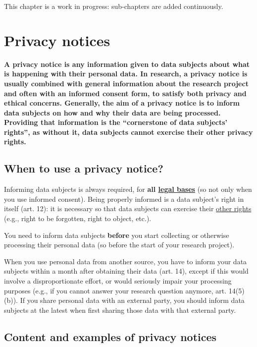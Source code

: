 \documentclass[
]{book}
\begin{document}
This chapter is a work in progress: sub-chapters are added continuously.

\hypertarget{privacy-notices}{%
\section{Privacy notices}\label{privacy-notices}}

\textbf{A privacy notice is any information given to data subjects about what is
happening with their personal data. In research, a privacy notice is usually
combined with general information about the research project and often with an
informed consent form, to satisfy both privacy and ethical concerns. Generally,
the aim of a privacy notice is to inform data subjects on how and why their
data are being processed. Providing that information is the ``cornerstone of
data subjects' rights'', as without it, data subjects cannot exercise their other
privacy rights.}

\hypertarget{when-to-use-a-privacy-notice}{%
\subsection{When to use a privacy notice?}\label{when-to-use-a-privacy-notice}}

Informing data subjects is always required, for \textbf{all \protect\hyperlink{legal-basis}{legal bases}}
(so not only when you use informed consent). Being properly informed is a data
subject's right in itself (art. 12):
it is necessary so that data subjects can exercise their \protect\hyperlink{data-subject-rights}{other rights}
(e.g., right to be forgotten, right to object, etc.).

You need to inform data subjects \textbf{before} you start collecting or otherwise
processing their personal data (so before the start of your research project).

When you use personal data from another source, you have to inform your data
subjects within a month after obtaining their data
(art. 14), except
if this would involve a disproportionate effort, or would seriously impair your
processing purposes (e.g., if you cannot answer your research question anymore,
art. 14(5)(b)).
If you share personal data with an external party, you should inform data
subjects at the latest when first sharing those data with that external party.

\hypertarget{content-and-examples-of-privacy-notices}{%
\subsection{Content and examples of privacy notices}\label{content-and-examples-of-privacy-notices}}
\end{document}
